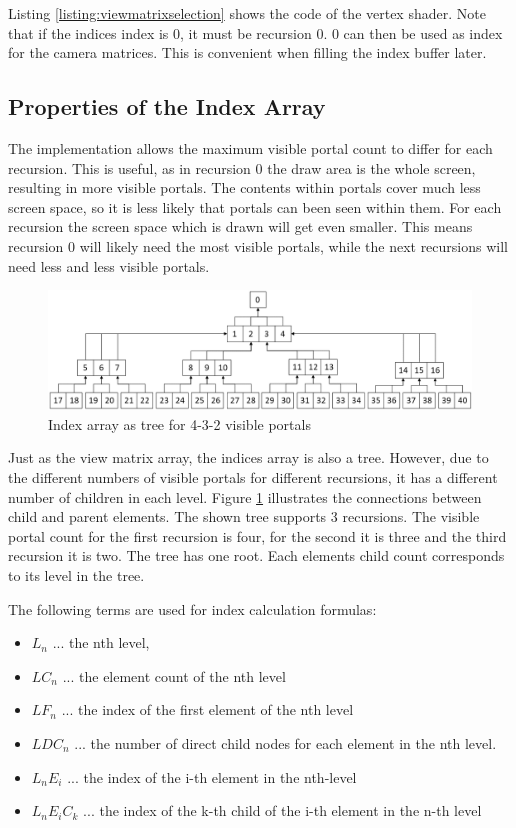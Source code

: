 Listing \ref{listing:viewmatrixselection} shows the code of the vertex shader. Note that if the indices index is 0, it must be recursion 0. 0 can then be used as index for the camera matrices. This is convenient when filling the index buffer later.

\subsection{Properties of the Index Array}
\label{section:indexarrayproperties}

The implementation allows the maximum visible portal count to differ for each recursion. This is useful, as in recursion 0 the draw area is the whole screen, resulting in more visible portals. The contents within portals cover much less screen space, so it is less likely that portals can been seen within them. For each recursion the screen space which is drawn will get even smaller. This means recursion 0 will likely need the most visible portals, while the next recursions will need less and less visible portals.

\begin{figure}[h]
	\includegraphics[width=\linewidth]{images/indexarray.png}
	\caption{Index array as tree for 4-3-2 visible portals}
	\label{fig:indexarray}
\end{figure}

Just as the view matrix array, the indices array is also a tree. However, due to the different numbers of visible portals for different recursions, it has a different number of children in each level. Figure \ref{fig:indexarray} illustrates the connections between child and parent elements. The shown tree supports 3 recursions. The visible portal count for the first recursion is four, for the second it is three and the third recursion it is two. The tree has one root. Each elements child count corresponds to its level in the tree.

The following terms are used for index calculation formulas:
\begin{itemize}
	\item $L_n$ ... the nth level,
	\item $LC_n$ ... the element count of the nth level
	\item $LF_n$ ... the index of the first element of the nth level
	\item $LDC_n$ ... the number of direct child nodes for each element in the nth level. 
	\item $L_nE_i$ ... the index of the i-th element in the nth-level
	\item $L_nE_iC_k$ ... the index of the k-th child of the i-th element in the n-th level 
\end{itemize}

